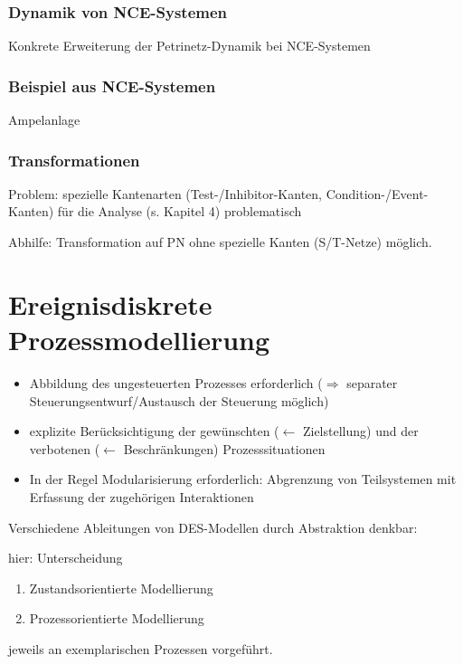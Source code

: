 \subsubsection{Dynamik von NCE-Systemen}
Konkrete Erweiterung der Petrinetz-Dynamik bei NCE-Systemen 

\subsubsection{Beispiel aus NCE-Systemen}
Ampelanlage 


\subsubsection{Transformationen}

\begin{descFixed}[2]
	\item[Problem:] spezielle Kantenarten (Test-/Inhibitor-Kanten, Condition-/Event-Kanten) für die Analyse (s. Kapitel 4) problematisch
	\item[Abhilfe:] Transformation auf PN ohne spezielle Kanten (S/T-Netze) möglich. 
\end{descFixed}

\section{Ereignisdiskrete Prozessmodellierung}
\begin{itemize}
	\item Abbildung des ungesteuerten Prozesses erforderlich ($\Rightarrow$ separater Steuerungsentwurf/Austausch der Steuerung möglich)
	\item explizite Berücksichtigung der gewünschten ($\leftarrow$ Zielstellung) und der verbotenen ($\leftarrow$ Beschränkungen) Prozesssituationen
	\item In der Regel Modularisierung erforderlich: Abgrenzung von Teilsystemen mit Erfassung der zugehörigen Interaktionen
\end{itemize}

Verschiedene Ableitungen von DES-Modellen durch Abstraktion denkbar:


hier: Unterscheidung
\begin{enumerate}
	\item Zustandsorientierte Modellierung
	\item Prozessorientierte Modellierung
\end{enumerate}
jeweils an exemplarischen Prozessen vorgeführt.

